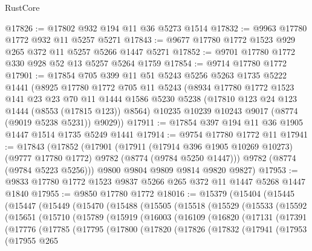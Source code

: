 \begin{lexlean}{RustCore}
\begin{coremodule}
@17826 := @17802 @932 @194 @11 @36 @5273 @1514
@17832 := @9963 @17780 @1772 @932 @11 @5257 @5271
@17843 := @9677 @17780 @1772 @1523 @929 @265 @372 @11 @5257 @5266 @1447 @5271
@17852 := @9701 @17780 @1772 @330 @928 @52 @13 @5257 @5264 @1759
@17854 := @9714 @17780 @1772
@17901 := @17854
    @705
    @399
    @11
    @51
    @5243
    @5256
    @5263
    @1735
    @5222
    @1441
    (@8925
      @17780
      @1772
      @705
      @11
      @5243
      (@8934
        @17780
        @1772
        @1523
        @141
        @23
        @23
        @70
        @11
        @1444
        @1586
        @5230
        @5238
        (@17810 @123 @24 @123 @1444 (@8553 (@17815 @123)) @8564)
        @10235
        @10239
        @10243
        @9017
        (@8774 (@9019 @5238 @5231))
        @9029))
@17911 := @17854 @397 @194 @11 @36 @1905 @1447 @1514 @1735 @5249 @1441
@17914 := @9754 @17780 @1772 @11
@17941 := @17843
    (@17852
      (@17901
        (@17911
          (@17914 @396 @1905 @10269 @10273)
          (@9777 @17780 @1772)
          @9782
          (@8774 (@9784 @5250 @1447)))
        @9782
        (@8774 (@9784 @5223 @5256)))
      @9800
      @9804
      @9809
      @9814
      @9820
      @9827)
@17953 := @9833 @17780 @1772 @1523 @9837 @5266 @265 @372 @11 @1447 @5268 @1447 @1840
@17955 := @9850 @17780 @1772
@18016 := @15379
    (@15404
      (@15445
        (@15447
          (@15449
            (@15470
              (@15488
                (@15505
                  (@15518
                    (@15529
                      (@15533
                        (@15592
                          (@15651
                            (@15710
                              (@15789
                                (@15919
                                  (@16003
                                    (@16109
                                      (@16820
                                        (@17131
                                          (@17391
                                            (@17776
                                              (@17785
                                                (@17795
                                                  (@17800
                                                    (@17820
                                                      (@17826
                                                        (@17832
                                                          (@17941
                                                            (@17953
                                                              (@17955
                                                                @265

\end{coremodule}
\end{lexlean}
